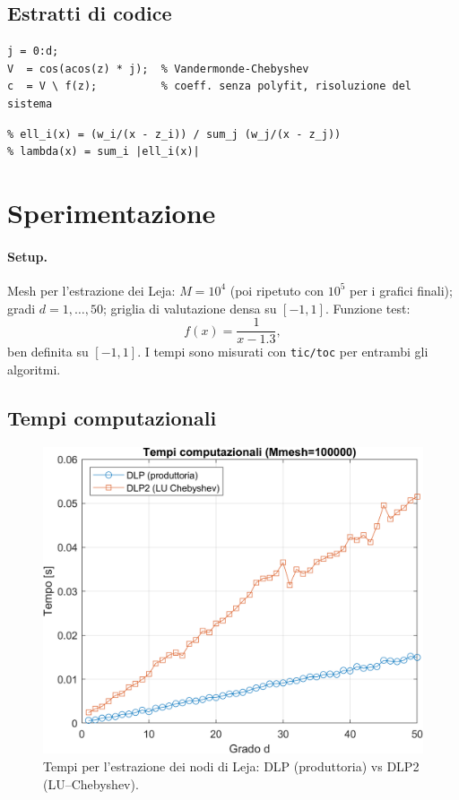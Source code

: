 \documentclass[12pt]{article}
\begin{document}
\subsection*{Estratti di codice}
\begin{lstlisting}[caption={Risoluzione dei coefficienti in base di Chebyshev}]
% z: nodi (Leja o equispaziati), f: funzione campionata in z
j = 0:d;
V  = cos(acos(z) * j);  % Vandermonde-Chebyshev
c  = V \ f(z);          % coeff. senza polyfit, risoluzione del sistema
\end{lstlisting}

\begin{lstlisting}[caption={Costante di Lebesgue (schema baricentrico)}]
% w_i = 1 / prod_{j!=i} (z_i - z_j)
% ell_i(x) = (w_i/(x - z_i)) / sum_j (w_j/(x - z_j))
% lambda(x) = sum_i |ell_i(x)|
\end{lstlisting}

\section{Sperimentazione}
\paragraph{Setup.} Mesh per l'estrazione dei Leja: \(M=10^4\) (poi ripetuto con \(10^5\) per i grafici finali); gradi \(d=1,\dots,50\); griglia di valutazione densa su \([{-}1,1]\). Funzione test:
\[
f(x)=\frac{1}{x-1.3},
\]
ben definita su \([{-}1,1]\). I tempi sono misurati con \verb|tic/toc| per entrambi gli algoritmi.

\subsection{Tempi computazionali}
\begin{figure}[htbp!]
  \centering
  \includegraphics[width=.9\textwidth]{tempi.png}
  \caption{Tempi per l'estrazione dei nodi di Leja: DLP (produttoria) vs DLP2 (LU--Chebyshev).}
\end{figure}
\end{document}
